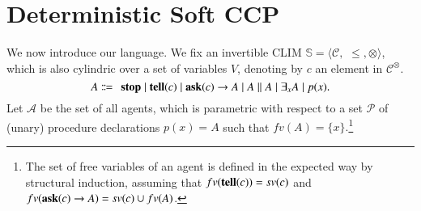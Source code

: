\documentclass[main.tex]{subfiles}
\begin{document}
\section{Deterministic Soft CCP}\label{sec:detSCCP}
We now introduce our language. 
We fix an invertible CLIM $\mathbb S = \langle {\mathcal C},$ $\leq, \otimes\rangle$, which is also cylindric 
over a set of variables $V$, denoting by
$c$ an element in ${\mathcal C}^\otimes$.
%
\[ A \Coloneqq \: \: \mathit{\ostop} \mid \textit{\tell}(c)  \mid \textit{\ask}(c) \rightarrow A \mid A \parallel A \mid \exists_x A \mid %
p(x).\]  
%
%
%
%
%
Let $\mathcal{A}$ be the set of all agents, which is
parametric with respect to a set $\mathcal{P}$ of (unary) procedure declarations 
$p(x) = A$ such that $fv(A) = \{x\}.$\footnote{The set of free variables of an agent is defined in the expected way by structural induction, assuming that $fv({\bf tell}(c)) = sv(c)$ and $fv({\bf ask}(c) \rightarrow A) = sv(c) \cup fv(A)$.}
%
%
%
\end{document}
